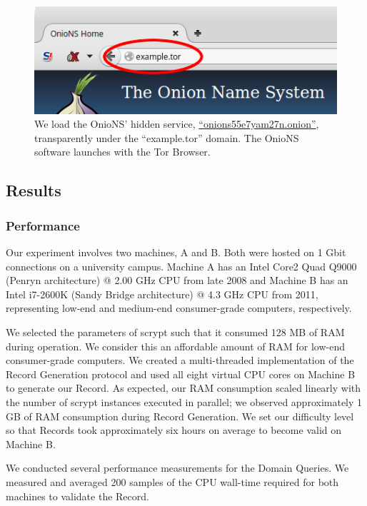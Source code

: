 \documentclass[USenglish,oneside,twocolumn]{article}
\begin{document}
\begin{figure}[h]
	\centering
	\includegraphics[width=\linewidth]{../assets/images/example.png}
	\caption{We load the OnioNS' hidden service, \href{http://onions55e7yam27n.onion}{``onions55e7yam27n.onion''}, transparently under the ``example.tor'' domain. The OnioNS software launches with the Tor Browser.}
	\label{fig:prototypeExample}
\end{figure}

\subsection{Results}

\subsubsection{Performance} %

Our experiment involves two machines, A and B. Both were hosted on 1 Gbit connections on a university campus. Machine A has an Intel Core2 Quad Q9000 (Penryn architecture) @ 2.00 GHz CPU from late 2008 and Machine B has an Intel i7-2600K (Sandy Bridge architecture) @ 4.3 GHz CPU from 2011, representing low-end and medium-end consumer-grade computers, respectively.

We selected the parameters of scrypt such that it consumed 128 MB of RAM during operation. We consider this an affordable amount of RAM for low-end consumer-grade computers. We created a multi-threaded implementation of the Record Generation protocol and used all eight virtual CPU cores on Machine B to generate our Record. As expected, our RAM consumption scaled linearly with the number of scrypt instances executed in parallel; we observed approximately 1 GB of RAM consumption during Record Generation. We set our difficulty level so that Records took approximately six hours on average to become valid on Machine B.

We conducted several performance measurements for the Domain Queries.  We measured and averaged 200 samples of the CPU wall-time required for both machines to validate the Record.
\end{document}
